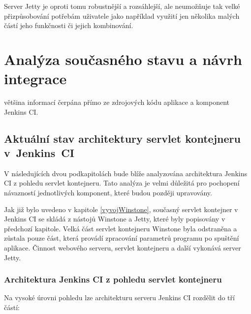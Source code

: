 \begin{itemize}
{                    Server Jetty
                    je oproti tomu robustnější a rozsáhlejší, ale neumožňuje tak velké přizpůsobování potřebám
                    uživatele jako například využití jen několika malých částí jeho funkčnosti či jejich
                    kombinování. }

            \end{itemize}
        


\chapter{Analýza současného stavu a návrh integrace}
    většina informací čerpána přímo ze zdrojových kódu aplikace a komponent Jenkins CI.
    
    \section{Aktuální stav architektury servlet kontejneru v~Jenkins~CI}
        V následujících dvou podkapitolách bude blíže analyzována architektura
        Jenkins CI z pohledu servlet kontejneru. Tato analýza je velmi důležitá
        pro pochopení návazností jednotlivých komponent, které budou později upravovány.

        Jak již bylo uvedeno v kapitole \ref{vyvojWinstone}, současný servlet kontejner 
        v Jenkins CI se skládá z nástojů Winstone a Jetty, které byly popisovány v 
        předchozí kapitole. Velká část servlet
        kontejneru Winstone byla odstraněna a zůstala pouze část, která
        provádí zpracování parametrů
        programu po spuštění aplikace. Činnost webového serveru, servlet kontejneru
        a další vykonává server Jetty.
        

        \subsection{Architektura Jenkins CI z pohledu servlet kontejneru}
            Na vysoké úrovni pohledu lze architekturu serveru Jenkins CI rozdělit do tří částí:
            
